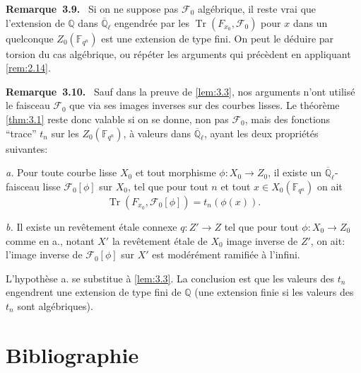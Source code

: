 \documentclass[10pt,a4paper]{article}
\makeatletter
\theoremstyle{plain}
\theoremstyle{definition}
\newenvironment{manualremark}[4]{%
  \par\medskip\noindent\textbf{#1~#2#3.}\def\@currentlabel{#2}\label{#4}\ }{\par\medskip}
\DeclareMathOperator{\tr}{Tr}
\makeatother
\begin{document}
\begin{manualremark}{Remarque}{3.9}{}{rem:3.9}
Si on ne suppose pas $\mathcal{F}_0$ alg\'ebrique, il reste vrai que l'extension de $\mathbb{Q}$ dans $\overline{\mathbb{Q}}_\ell$ engendr\'ee par les $\tr(F_{x_0}, \mathcal{F}_0)$ pour $x$ dans un quelconque $Z_0(\mathbb{F}_{q^n})$ est une extension de type fini. On peut le d\'eduire par torsion du cas alg\'ebrique, ou r\'ep\'eter les arguments qui pr\'ec\`edent en appliquant \ref{rem:2.14}.
\end{manualremark}

\begin{manualremark}{Remarque}{3.10}{}{rem:3.10}
Sauf dans la preuve de \ref{lem:3.3}, nos arguments n'ont utilis\'e le faisceau $\mathcal{F}_0$ que via ses images inverses sur des courbes lisses. Le th\'eor\`eme \ref{thm:3.1} reste donc valable si on se donne, non pas $\mathcal{F}_0$, mais des fonctions ``trace'' $t_n$ sur les $Z_0(\mathbb{F}_{q^n})$, \`a valeurs dans $\overline{\mathbb{Q}}_\ell$, ayant les deux propri\'et\'es suivantes:

\emph{a.} Pour toute courbe lisse $X_0$ et tout morphisme $\phi: X_0 \to Z_0$, il existe un $\overline{\mathbb{Q}}_\ell$-faisceau lisse $\mathcal{F}_0[\phi]$ sur $X_0$, tel que pour tout $n$ et tout $x \in X_0(\mathbb{F}_{q^n})$ on ait
\[
\tr(F_{x_0}, \mathcal{F}_0[\phi]) = t_n(\phi(x)).
\]

\emph{b.} Il existe un rev\^etement \'etale connexe $q: Z' \to Z$ tel que pour tout $\phi: X_0 \to Z_0$ comme en a., notant $X'$ la rev\^etement \'etale de $X_0$ image inverse de $Z'$, on ait: l'image inverse de $\mathcal{F}_0[\phi]$ sur $X'$ est mod\'er\'ement ramifi\'ee \`a l'infini.

L'hypoth\`ese a. se substitue \`a \ref{lem:3.3}. La conclusion est que les valeurs des $t_n$ engendrent une extension de type fini de $\mathbb{Q}$ (une extension finie si les valeurs des $t_n$ sont alg\'ebriques).
\end{manualremark}

\section*{Bibliographie}
\end{document}
